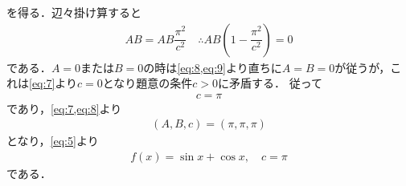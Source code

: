 \documentclass[../../main.tex]{subfiles}
\begin{document}
を得る．辺々掛け算すると
\begin{align}
  AB = AB \dfrac{\pi^2}{c^2} \quad \therefore AB\left(1-\dfrac{\pi^2}{c^2}\right) = 0
\end{align}
である．$A=0$または$B=0$の時は\cref{eq:8,eq:9}より直ちに$A=B=0$が従うが，これは\cref{eq:7}より$c=0$となり題意の条件$c>0$に矛盾する．
従って
\begin{align}
  c = \pi
\end{align}
であり，\cref{eq:7,eq:8}より
\begin{align}
  (A,B,c)=(\pi,\pi,\pi)
\end{align}
となり，\cref{eq:5}より
\begin{align}
  f(x)=\sin x+\cos x, \quad c=\pi
\end{align}
である．

\newpage
\end{document}
